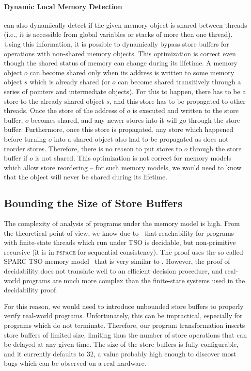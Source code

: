 \paragraph{Dynamic Local Memory Detection}
\divine can also dynamically detect if the given memory object is shared between threads (i.e., it is accessible from global variables or stacks of more then one thread).
Using this information, it is possible to dynamically bypass store buffers for operations with non-shared memory objects.
This optimization is correct even though the shared status of memory can change during its lifetime.
A memory object $o$ can become shared only when its address is written to some memory object $s$ which is already shared (or $o$ can become shared transitively through a series of pointers and intermediate objects).
For this to happen, there has to be a store to the already shared object $s$, and this store has to be propagated to other threads.
Once the store of the address of $o$ is executed and written to the store buffer, $o$ becomes shared, and any newer stores into it will go through the store buffer.
Furthermore, once this store is propagated, any store which happened before turning $o$ into a shared object also had to be propagated as \xtso does not reorder stores.
Therefore, there is no reason to put stores to $o$ through the store buffer if $o$ is not shared.
This optimization is not correct for memory models which allow store reordering -- for such memory models, we would need to know that the object will never be shared during its lifetime.

\subsection{Bounding the Size of Store Buffers}

The complexity of analysis of programs under the \xtso memory model is high.
From the theoretical point of view, we know due to~ that reachability for programs with finite-state threads which run under TSO is decidable, but non-primitive recursive (it is in \textsc{pspace} for sequential consistency).
The proof uses the so called SPARC TSO memory model~ that is very similar to \xtso. However, the proof of decidability does not translate well to an efficient decision procedure, and real-world programs are much more complex than the finite-state systems used in the decidability proof.

For this reason, we would need to introduce unbounded store buffers to properly
verify real-world programs. Unfortunately, this can be impractical, especially for programs which do not terminate.
Therefore, our program transformation
inserts store buffers of limited size, limiting thus the number of store
operations that can be delayed at any given time. The
size of the store buffers is fully configurable, and it currently defaults to
32, a value probably high enough to discover most bugs which can be observed on
a real hardware.

